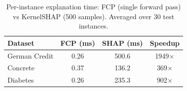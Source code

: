 \begin{table}[ht]
  \centering
  \caption{Per-instance explanation time: FCP (single forward pass) vs KernelSHAP (500 samples). Averaged over 30 test instances.}
  \label{tab:timing}
  \begin{tabular}{@{}lccc@{}}
    \toprule
    \textbf{Dataset} & \textbf{FCP (ms)} & \textbf{SHAP (ms)} & \textbf{Speedup} \\
    \midrule
    German Credit & 0.26 & 500.6 & 1949$\times$ \\
    Concrete & 0.37 & 136.2 & 369$\times$ \\
    Diabetes & 0.26 & 235.3 & 902$\times$ \\
    \bottomrule
  \end{tabular}
\end{table}